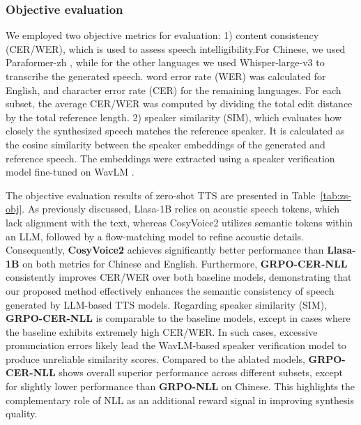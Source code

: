 \documentclass{article}
\begin{document}
\vspace{-0.3cm}
\subsubsection{Objective evaluation}
\vspace{-0.2cm}

We employed two objective metrics for evaluation:
1) content consistency (CER/WER),
which is used to assess speech intelligibility.For Chinese, we used Paraformer-zh \cite{funasr}, while for the other languages we used Whisper-large-v3 \cite{whisper} to transcribe the generated speech. 
word error rate (WER) was calculated for English, and character error rate (CER) for the remaining languages. For each subset, the average CER/WER was computed by dividing the total edit distance by the total reference length.
2) speaker similarity (SIM), which evaluates how closely the synthesized speech matches the reference speaker. It is calculated as the cosine similarity between the speaker embeddings of the generated and reference speech. The embeddings were extracted using a speaker verification model fine-tuned on WavLM \cite{wavlm-sv}.

The objective evaluation results of zero-shot TTS are presented in Table~\ref{tab:zs-obj}. As previously discussed, Llasa-1B \cite{llasa} relies on acoustic speech tokens, which lack alignment with the text, whereas CosyVoice2 \cite{cosyvoice2} utilizes semantic tokens within an LLM, followed by a flow-matching model to refine acoustic details. Consequently, \textbf{CosyVoice2} achieves significantly better performance than \textbf{Llasa-1B} on both metrics for Chinese and English.
Furthermore, \textbf{GRPO-CER-NLL} consistently improves CER/WER over both baseline models, demonstrating that our proposed method effectively enhances the semantic consistency of speech generated by LLM-based TTS models. Regarding speaker similarity (SIM), \textbf{GRPO-CER-NLL} is comparable to the baseline models, except in cases where the baseline exhibits extremely high CER/WER. In such cases, excessive pronunciation errors likely lead the WavLM-based speaker verification model to produce unreliable similarity scores.
Compared to the ablated models, \textbf{GRPO-CER-NLL} shows overall superior performance across different subsets, except for slightly lower performance than \textbf{GRPO-NLL} on Chinese. This highlights the complementary role of NLL as an additional reward signal in improving synthesis quality.

\vspace{-0.4cm}
\end{document}
